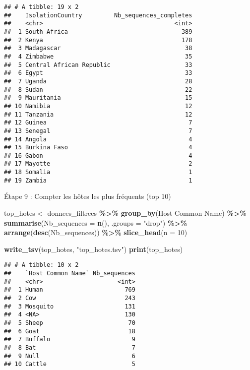 \documentclass[
]{article}
\newenvironment{Shaded}{\begin{snugshade}}{\end{snugshade}}
\newcommand{\AttributeTok}[1]{\textcolor[rgb]{0.13,0.29,0.53}{#1}}
\newcommand{\DecValTok}[1]{\textcolor[rgb]{0.00,0.00,0.81}{#1}}
\newcommand{\FunctionTok}[1]{\textcolor[rgb]{0.13,0.29,0.53}{\textbf{#1}}}
\newcommand{\NormalTok}[1]{#1}
\newcommand{\OtherTok}[1]{\textcolor[rgb]{0.56,0.35,0.01}{#1}}
\newcommand{\SpecialCharTok}[1]{\textcolor[rgb]{0.81,0.36,0.00}{\textbf{#1}}}
\newcommand{\StringTok}[1]{\textcolor[rgb]{0.31,0.60,0.02}{#1}}
\begin{document}
\begin{verbatim}
## # A tibble: 19 x 2
##    IsolationCountry         Nb_sequences_completes
##    <chr>                                     <int>
##  1 South Africa                                389
##  2 Kenya                                       178
##  3 Madagascar                                   38
##  4 Zimbabwe                                     35
##  5 Central African Republic                     33
##  6 Egypt                                        33
##  7 Uganda                                       28
##  8 Sudan                                        22
##  9 Mauritania                                   15
## 10 Namibia                                      12
## 11 Tanzania                                     12
## 12 Guinea                                        7
## 13 Senegal                                       7
## 14 Angola                                        4
## 15 Burkina Faso                                  4
## 16 Gabon                                         4
## 17 Mayotte                                       2
## 18 Somalia                                       1
## 19 Zambia                                        1
\end{verbatim}

Étape 9 : Compter les hôtes les plus fréquents (top 10)

\begin{Shaded}
\begin{Highlighting}[]
\NormalTok{top\_hotes }\OtherTok{\textless{}{-}}\NormalTok{ donnees\_filtrees }\SpecialCharTok{\%\textgreater{}\%}
  \FunctionTok{group\_by}\NormalTok{(}\StringTok{\textasciigrave{}}\AttributeTok{Host Common Name}\StringTok{\textasciigrave{}}\NormalTok{) }\SpecialCharTok{\%\textgreater{}\%}
  \FunctionTok{summarise}\NormalTok{(}\AttributeTok{Nb\_sequences =} \FunctionTok{n}\NormalTok{(), }\AttributeTok{.groups =} \StringTok{"drop"}\NormalTok{) }\SpecialCharTok{\%\textgreater{}\%}
  \FunctionTok{arrange}\NormalTok{(}\FunctionTok{desc}\NormalTok{(Nb\_sequences)) }\SpecialCharTok{\%\textgreater{}\%}
  \FunctionTok{slice\_head}\NormalTok{(}\AttributeTok{n =} \DecValTok{10}\NormalTok{)}

\FunctionTok{write\_tsv}\NormalTok{(top\_hotes, }\StringTok{"top\_hotes.tsv"}\NormalTok{)}
\FunctionTok{print}\NormalTok{(top\_hotes)}
\end{Highlighting}
\end{Shaded}

\begin{verbatim}
## # A tibble: 10 x 2
##    `Host Common Name` Nb_sequences
##    <chr>                     <int>
##  1 Human                       769
##  2 Cow                         243
##  3 Mosquito                    131
##  4 <NA>                        130
##  5 Sheep                        70
##  6 Goat                         18
##  7 Buffalo                       9
##  8 Bat                           7
##  9 Null                          6
## 10 Cattle                        5
\end{verbatim}
\end{document}
